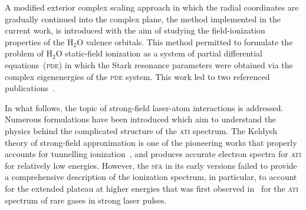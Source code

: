
A modified exterior complex scaling approach in which the radial
coordinates are gradually continued into the complex plane, the method
implemented in the current work, is introduced with the aim of
studying the field-ionization properties of the H$_{2}$O valence
orbitals. This method permitted to formulate the problem of H$_{2}$O
static-field ionization as a system of partial differential
equations~(\textsc{pde}) in which the Stark resonance parameters were
obtained via the complex eigenenergies of the \textsc{pde}
system. This work led to two referenced
publications~\cite{sarias_2016,sarias_2017}.






In what follows, the topic of strong-field laser-atom interactions is
addressed. Numerous formulations have been introduced which aim to
understand the physics behind the complicated structure of the
\textsc{ati} spectrum.  The Keldysh theory of strong-field
approximation is one of the pioneering works that properly accounts
for tunnelling ionization~\cite{KeldyshSFA}, and produces accurate
electron spectra for \textsc{ati} for relatively low
energies. However, the \textsc{sfa} in its early versions failed to
provide a comprehensive description of the ionization spectrum, in
particular, to account for the extended plateau at higher energies
that was first observed in~\cite{Paulus_1994plateau} for the
\textsc{ati} spectrum of rare gases in strong laser pulses.

